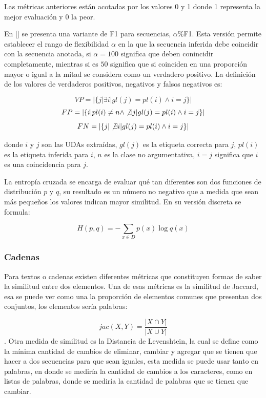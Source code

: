 Las métricas anteriores están acotadas por los valores 0 y 1 donde 1 representa la mejor evaluación y 0 la 
peor.

En [\cite{persing2016end}] se presenta una variante de F1 para secuencias, $\alpha$\%F1. Esta versión permite
establecer el rango de flexibilidad $\alpha$ en la que la secuencia inferida debe coincidir con la secuencia
anotada, si $\alpha=100$ significa que deben conincidir completamente, mientras si es $50$ significa que 
si coinciden en una proporción mayor o igual a la mitad se considera como un verdadero positivo. La 
definición de los valores de verdaderos positivos, negativos y falsos negativos es:

\begin{equation}
	VP = |\{ j | \exists i | gl(j) = pl(i) \land i = j \}|
\end{equation}
\begin{equation}
	FP = |\{ i | pl(i) \neq n \land \not\exists j | gl(j) = pl(i) \land i = j \}|
\end{equation}
\begin{equation}
	FN = |\{ j | \not\exists i | gl(j) = pl(i) \land i = j \}|
\end{equation}

donde $i$ y $j$ son las UDAs extraídas, $gl(j)$ es la etiqueta correcta para $j$, $pl(i)$ es 
la etiqueta inferida para $i$, $n$ es la clase no argumentativa, $i = j$ significa que $i$ es 
una coincidencia para $j$.

La entropía cruzada se encarga de evaluar qué tan diferentes son dos funciones de distribución $p$ y $q$, su 
resultado es un número no negativo que a medida que sean más pequeños los valores indican mayor similitud. 
En su versión discreta se formula:

\begin{equation}
	H(p, q) = - \sum_{x \in D} p(x) \log q(x)
\end{equation}

\subsubsection{Cadenas}

Para textos o cadenas existen diferentes métricas que constituyen formas de saber la similitud 
entre dos elementos. Una de esas métricas es la similitud de Jaccard, esa se puede ver como una 
la proporción de elementos comunes que presentan dos conjuntos, los elementos sería palabras:

\begin{equation}
	jac(X, Y) = \frac{|X \cap Y|}{|X \cup Y|}
\end{equation}.
Otra medida de similitud es la Distancia de Levenshtein, la cual se define como la mínima cantidad 
de cambios de eliminar, cambiar y agregar que se tienen que hacer a dos secuencias para que sean 
iguales, esta medida se puede usar tanto en palabras, en donde se mediría la cantidad de cambios 
a los caracteres, como en listas de palabras, donde se mediría la cantidad de palabras que 
se tienen que cambiar. 


